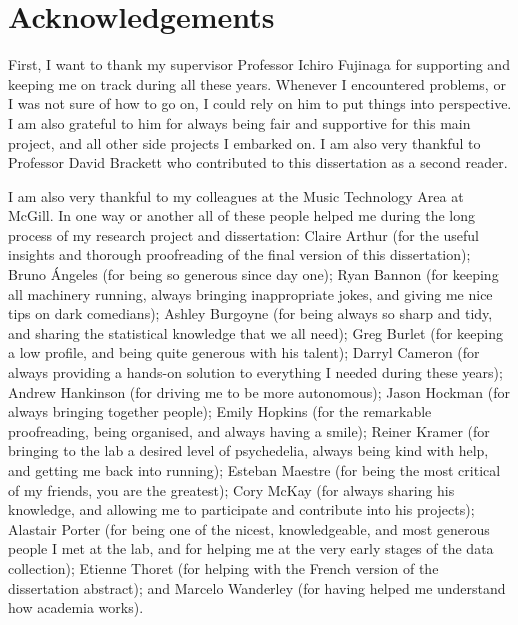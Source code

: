 \documentclass[12pt,letterpaper]{report}
\begin{document}

\newpage

\section*{\centering Acknowledgements}

First, I want to thank my supervisor Professor Ichiro Fujinaga for supporting and keeping me on track during all these years. Whenever I encountered problems, or I was not sure of how to go on, I could rely on him to put things into perspective. I am also grateful to him for always being fair and supportive for this main project, and all other side projects I embarked on. I am also very thankful to Professor David Brackett who contributed to this dissertation as a second reader.


I am also very thankful to my colleagues at the Music Technology Area at McGill. In one way or another all of these people helped me during the long process of my research project and dissertation: 
Claire Arthur (for the useful insights and thorough proofreading of the final version of this dissertation);  
Bruno \'Angeles (for being so generous since day one); 
Ryan Bannon (for keeping all machinery running, always bringing inappropriate jokes, and giving me nice tips on dark comedians); 
Ashley Burgoyne (for being always so sharp and tidy, and sharing the statistical knowledge that we all need); 
Greg Burlet (for keeping a low profile, and being quite generous with his talent); 
Darryl Cameron (for always providing a hands-on solution to everything I needed during these years);
Andrew Hankinson (for driving me to be more autonomous); 
Jason Hockman (for always bringing together people); 
Emily Hopkins (for the remarkable proofreading, being organised, and always having a smile); 
Reiner Kramer (for bringing to the lab a desired level of psychedelia, always being kind with help, and getting me back into running);
Esteban Maestre (for being the most critical of my friends, you are the greatest); 
Cory McKay (for always sharing his knowledge, and allowing me to participate and contribute into his projects);
Alastair Porter (for being one of the nicest, knowledgeable, and most generous people I met at the lab, and for helping me at the very early stages of the data collection); 
Etienne Thoret (for helping with the French version of the dissertation abstract); and
Marcelo Wanderley (for having helped me understand how academia works). 
\end{document}
